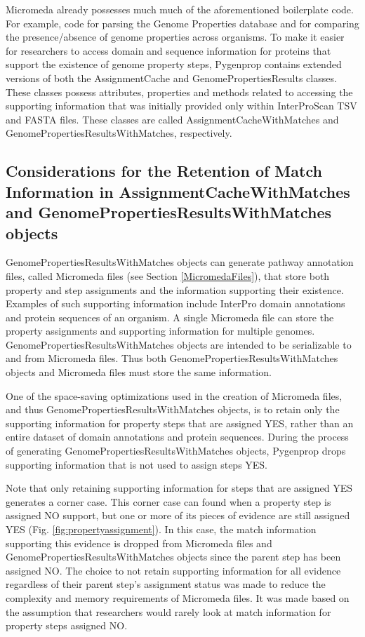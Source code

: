 Micromeda already possesses much much of the aforementioned boilerplate code. For example, code for parsing the Genome Properties database and for comparing the presence/absence of genome properties across organisms. To make it easier for researchers to access domain and sequence information for proteins that support the existence of genome property steps, Pygenprop contains extended versions of both the AssignmentCache and GenomePropertiesResults classes. These classes possess attributes, properties and methods related to accessing the supporting information that was initially provided only within InterProScan TSV and FASTA files. These classes are called AssignmentCacheWithMatches and GenomePropertiesResultsWithMatches, respectively.

\subsection{Considerations for the Retention of Match Information in AssignmentCacheWithMatches and GenomePropertiesResultsWithMatches objects} \label{MatchConsiderations}

GenomePropertiesResultsWithMatches objects can generate pathway annotation files, called Micromeda files (see Section \ref{MicromedaFiles}), that store both property and step assignments and the information supporting their existence. Examples of such supporting information include InterPro domain annotations and protein sequences of an organism. A single Micromeda file can store the property assignments and supporting information for multiple genomes. GenomePropertiesResultsWithMatches objects are intended to be serializable to and from Micromeda files. Thus both   GenomePropertiesResultsWithMatches objects and Micromeda files must store the same information.

One of the space-saving optimizations used in the creation of Micromeda files, and thus GenomePropertiesResultsWithMatches objects, is to retain only the supporting information for property steps that are assigned YES, rather than an entire dataset of domain annotations and protein sequences. During the process of generating GenomePropertiesResultsWithMatches objects, Pygenprop drops supporting information that is not used to assign steps YES.

Note that only retaining supporting information for steps that are assigned YES generates a corner case. This corner case can found when a property step is assigned NO support, but one or more of its pieces of evidence are still assigned YES (Fig. \ref{fig:propertyassignment}). In this case, the match information supporting this evidence is dropped from Micromeda files and GenomePropertiesResultsWithMatches objects since the parent step has been assigned NO. The choice to not retain supporting information for all evidence regardless of their parent step's assignment status was made to reduce the complexity and memory requirements of Micromeda files. It was made based on the assumption that researchers would rarely look at match information for property steps assigned NO.

